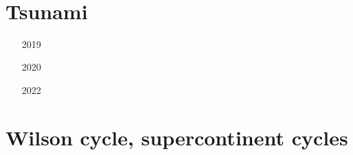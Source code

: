 \begin{small}
\begin{itemize}
\item[\nineteenseventytwo] 
\item[\nineteenseventyeight] 
\item[\twothousandseven] 
\item[\twothousandten] 
\item[\twothousandtwelve] 
\item[\twothousandthirteen] 
\item[\twothousandeighteen] 
\item[\twothousandtwenty] 
 \\
\item[\twothousandtwentytwo] 
\end{itemize}
\end{small}

\section{Tsunami}

\begin{small}
\begin{itemize}
\item[2019] 
\item[2020]  
\item[2022] 
\end{itemize}
\end{small}




\section{Wilson cycle, supercontinent cycles}

